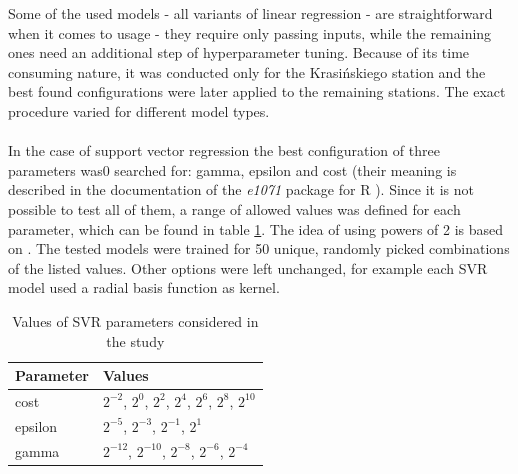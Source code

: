 \noindent Some of the used models - all variants of linear regression - are straightforward when it comes to usage - they require only passing inputs, while the remaining ones need an additional step of hyperparameter tuning. Because of its time consuming nature, it was conducted only for the Krasińskiego station and the best found configurations were later applied to the remaining stations. The exact procedure varied for different model types.
\\\\
\noindent In the case of support vector regression the best configuration of three parameters was0 searched for: gamma, epsilon and cost (their meaning is described in the documentation of the \textit{e1071} package for R \cite{E1071SVM2017}). Since it is not possible to test all of them, a range of allowed values was defined for each parameter, which can be found in table \ref{tab:methodology-svr-params}. The idea of using powers of 2 is based on \cite{HSU2010}. The tested models were trained for 50 unique, randomly picked combinations of the listed values. Other options were left unchanged, for example each SVR model used a radial basis function as kernel.
\begin{table}[ht]
\centering
\caption{Values of SVR parameters considered in the study}
\label{tab:methodology-svr-params}
\begin{tabular}{ll}
\toprule
Parameter & Values \\ \midrule
cost & $2^{-2}$, $2^{0}$, $2^{2}$, $2^{4}$, $2^{6}$, $2^{8}$, $2^{10}$ \\
epsilon & $2^{-5}$, $2^{-3}$, $2^{-1}$, $2^{1}$ \\
gamma & $2^{-12}$, $2^{-10}$, $2^{-8}$, $2^{-6}$, $2^{-4}$ \\ \bottomrule
\end{tabular}
\end{table}
